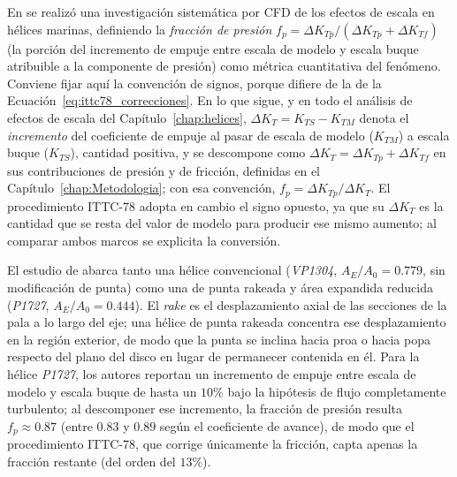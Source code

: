 En \citet{gallotti2026} se realizó una investigación sistemática por CFD de los
efectos de escala en hélices marinas, definiendo la \emph{fracción de presión}
$f_p = \Delta K_{Tp}/(\Delta K_{Tp}+\Delta K_{Tf})$ (la porción del incremento de
empuje entre escala de modelo y escala buque atribuible a la componente de
presión) como métrica cuantitativa del fenómeno. Conviene fijar aquí la
convención de signos, porque difiere de la de la
Ecuación~\eqref{eq:ittc78_correcciones}. En lo que sigue, y en todo el análisis de
efectos de escala del Capítulo~\ref{chap:helices}, $\Delta K_T = K_{TS} - K_{TM}$
denota el \emph{incremento} del coeficiente de empuje al pasar de escala de modelo
($K_{TM}$) a escala buque ($K_{TS}$), cantidad positiva, y se descompone como
$\Delta K_T = \Delta K_{Tp} + \Delta K_{Tf}$ en sus contribuciones de presión y de
fricción, definidas en el Capítulo~\ref{chap:Metodologia}; con esa convención,
$f_p = \Delta K_{Tp}/\Delta K_T$. El procedimiento ITTC-78 adopta en cambio el
signo opuesto, ya que su $\Delta K_T$ es la cantidad que se resta del valor de
modelo para producir ese mismo aumento; al comparar ambos marcos se explicita la
conversión.

El estudio de \citet{gallotti2026} abarca tanto una hélice convencional (\textit{VP1304},
$A_E/A_0=0.779$, sin modificación de punta) como una de punta rakeada y área
expandida reducida (\textit{P1727}, $A_E/A_0=0.444$). El \emph{rake} es el desplazamiento axial de las
secciones de la pala a lo largo del eje; una hélice de punta rakeada concentra ese
desplazamiento en la región exterior, de modo que la punta se inclina hacia proa o
hacia popa respecto del plano del disco en lugar de permanecer contenida en él.
Para la hélice \textit{P1727}, los autores reportan un incremento de empuje entre escala
de modelo y escala buque de hasta un $10\%$ bajo la hipótesis de flujo
completamente turbulento; al descomponer ese incremento, la fracción de presión resulta $f_p\approx0.87$ (entre
$0.83$ y $0.89$ según el coeficiente de avance), de modo que el procedimiento
ITTC-78, que corrige únicamente la fricción, capta apenas la fracción restante
(del orden del $13\%$).

